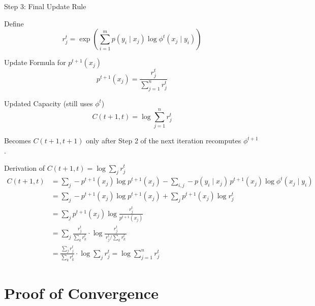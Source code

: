 \documentclass{beamer}
\begin{document}
\begin{frame}[t]{Step 3: Final Update Rule}
    \footnotesize
    \begin{exampleblock}{Define}\vspace{-0.4em}
        $$
            r_j^t = \exp\!\left( \sum_{i=1}^{m} p(y_i \mid x_j) \log \phi^t(x_j \mid y_i) \right)
        $$
    \end{exampleblock}
    \vspace{-0.6em}
    \begin{block}{Update Formula for $p^{t+1}(x_j)$}\vspace{-0.4em}
        $$
            \boxed{\; p^{t+1}(x_j) = \frac{r_j^t}{\sum_{j=1}^{n} r_j^t} \;}
        $$
    \end{block}
    \vspace{-0.6em}
    \begin{block}{Updated Capacity (still uses $\phi^t$)}\vspace{-0.4em}
        $$
            \boxed{\; C(t+1, t) = \log \sum_{j=1}^{n} r_j^t \;}
        $$
        \vspace{-0.6em}

        Becomes $C(t+1,t+1)$ only after Step 2 of the next iteration recomputes $\phi^{t+1}$.
    \end{block}
\end{frame}

\begin{frame}{Derivation of $C(t+1, t) = \log \sum_j r_j^t$}
    \footnotesize
    \begin{align*}
        C(t+1, t) &= \sum_j -p^{t+1}(x_j) \log p^{t+1}(x_j) - \sum_{i,j} -p(y_i \mid x_j)\, p^{t+1}(x_j) \log \phi^t(x_j \mid y_i) \\
                  &= \sum_j -p^{t+1}(x_j) \log p^{t+1}(x_j) + \sum_j p^{t+1}(x_j) \log r_j^t \\
                  &= \sum_j p^{t+1}(x_j) \log \frac{r_j^t}{p^{t+1}(x_j)} \\
                  &= \sum_j \frac{r_j^t}{\sum_k r_k^t} \cdot \log \frac{r_j^t}{\,r_j^t \big/ \sum_k r_k^t\,} \\
                  &= \frac{\sum_j r_j^t}{\sum_k r_k^t} \cdot \log \sum_j r_j^t = \log \sum_{j=1}^{n} r_j^t
    \end{align*}
\end{frame}

\section{Proof of Convergence}
\end{document}

